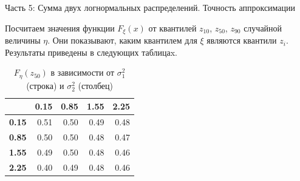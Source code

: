 \documentclass[ucs, notheorems, handout]{beamer}
\begin{document}
\begin{frame}{Часть 5: Сумма двух логнормальных распределений. Точность аппроксимации}
	
	Посчитаем значения функции $F_{\xi}(x)$ от квантилей $z_{10}$, $z_{50}$, $z_{90}$ случайной величины $\eta$. Они показывают, каким квантилем для $\xi$ являются квантили $z_{i}$. Результаты приведены в следующих таблицаx.
	
	\begin{table}[!hhh]
		\centering
		\caption{$F_{\eta}(z_{50})$ в зависимости от $\sigma_{1}^{2}$ (строка) и $\sigma_{2}^{2}$ (столбец) }
		\label{tab4}
		\begin{tabular}{rrrrr}
			\hline
			& \textbf{0.15} & \textbf{0.85} & \textbf{1.55} & \textbf{2.25} \\
			\hline
			\textbf{0.15} & 0.51 & 0.50 & 0.49 & 0.48 \\ 
			\textbf{0.85} & 0.50 & 0.50 & 0.48 & 0.47 \\ 
			\textbf{1.55} & 0.49 & 0.50 & 0.48 & 0.46 \\ 
			\textbf{2.25} & 0.40 & 0.49 & 0.48 & 0.46 \\ 
			\hline
		\end{tabular}
	\end{table}	
\end{frame}
\end{document}

